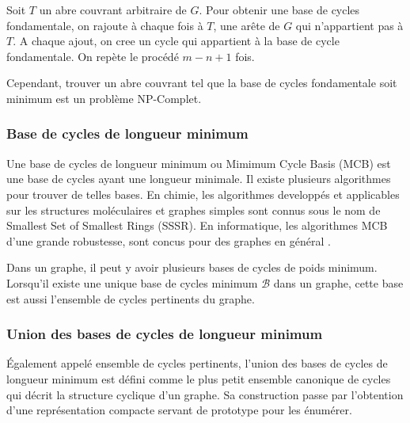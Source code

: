 Soit $T$ un abre couvrant arbitraire de $G$. Pour obtenir une base de cycles fondamentale, on rajoute à chaque fois à $T$, une arête de $G$ qui n'appartient pas à $T$. A chaque ajout, on cree un cycle qui appartient à la base de cycle fondamentale. On repète le procédé $m-n+1$ fois.

Cependant, trouver un abre couvrant tel que la base de cycles fondamentale soit minimum est un problème NP-Complet.

\subsubsection{Base de cycles de longueur minimum}

Une base de cycles de longueur minimum ou Mimimum Cycle Basis (MCB) est une base de cycles ayant une longueur minimale. Il existe plusieurs algorithmes pour trouver de telles bases. En chimie, les algorithmes developpés et applicables sur les structures moléculaires et graphes simples sont connus sous le nom de Smallest Set of Smallest Rings (SSSR)\cite{LeeJoon,Zamora,Qian}. En informatique, les algorithmes MCB d'une grande robustesse, sont concus pour des graphes en général \cite{horton,golynski2002polynomial,berger2004minimum,kavitha2004faster}.

Dans un graphe, il peut y avoir plusieurs bases de cycles de poids minimum. Lorsqu'il existe une unique base de cycles minimum $\mathcal{B}$ dans un graphe, cette base est aussi l'ensemble de cycles pertinents du graphe.

\subsubsection{Union des bases de cycles de longueur minimum}


Également appelé ensemble de cycles pertinents, l'union des bases de cycles de longueur minimum est défini comme le plus petit ensemble canonique de cycles qui décrit la structure cyclique d'un graphe\cite{vismara}. Sa construction passe par l'obtention d'une représentation compacte servant de prototype pour les énumérer.